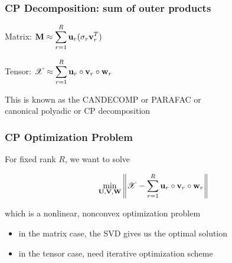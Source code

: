 \documentclass[xcolor=dvipsnames]{beamer}
\begin{document}
\begin{frame}
\frametitle{CP Decomposition: sum of outer products}

Matrix: \quad $\displaystyle \M{M} \approx \sum_{r=1}^R \MC{U}{r} (\sigma_r \MC{V}{r}^T)$
\begin{center}
\end{center}
\vfill
Tensor: \quad $\displaystyle \T{X}\approx \sum_{r=1}^R \MC{U}{r}\circ\MC{V}{r}\circ\MC{W}{r}$
\begin{center}
\end{center}
\vfill
\begin{center}
This is known as the CANDECOMP or PARAFAC or \\ canonical polyadic or \textcolor{wfugold}{CP decomposition}
\end{center}

\end{frame}

\begin{frame}
\frametitle{CP Optimization Problem}

\begin{center}
\end{center}
\vfill
\begin{flushleft} 
For fixed rank $R$, we want to solve
\end{flushleft}
$$\min_{\M{U},\M{V},\M{W}} \left\|\T{X}-\sum_{r=1}^R \MC{U}{r}\circ\MC{V}{r}\circ\MC{W}{r}\right\| $$
\vfill
\begin{flushright}
which is a nonlinear, nonconvex optimization problem
\end{flushright}
\vfill
{\small 
\begin{itemize}
	\item in the matrix case, the SVD gives us the optimal solution
	\item in the tensor case, need iterative optimization scheme
\end{itemize}
}

\end{frame}
\end{document}
